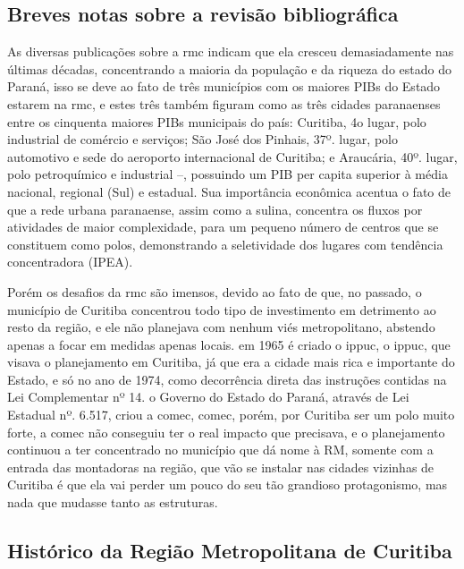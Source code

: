 	\subsection{Breves notas sobre a revisão bibliográfica}
	
	As diversas publicações sobre a \gls{rmc} indicam que ela cresceu demasiadamente nas últimas décadas, concentrando a maioria da população e da riqueza do estado do Paraná, isso se deve ao fato de três municípios com os maiores PIBs do Estado estarem na \gls{rmc}, e estes três também figuram como as três cidades paranaenses entre os cinquenta maiores PIBs municipais do país: Curitiba, 4o lugar, polo industrial de comércio e serviços; São José dos Pinhais, 37º. lugar, polo automotivo e sede do aeroporto internacional de Curitiba; e Araucária, 40º. lugar, polo petroquímico e industrial –, possuindo um PIB per capita superior à média nacional, regional (Sul) e estadual. Sua importância econômica acentua o fato de que a rede urbana paranaense, assim como a sulina, concentra os fluxos por atividades de maior complexidade, para um pequeno número de centros que se constituem como polos, demonstrando a seletividade dos lugares com tendência concentradora (IPEA).
	
	Porém os desafios da \gls{rmc} são imensos, devido ao fato de que, no passado, o município de Curitiba concentrou todo tipo de investimento em detrimento ao resto da região, e ele não planejava com nenhum viés metropolitano, abstendo apenas a focar em medidas apenas locais. em 1965 é criado o \glsdesc{ippuc}, o \gls{ippuc}, que  visava o planejamento em Curitiba, já que era a cidade mais rica e importante do Estado, e só no ano de 1974, como decorrência direta das instruções contidas na Lei Complementar nº 14. o Governo do Estado do Paraná, através de Lei Estadual nº. 6.517, criou a \glsdesc{comec}, \gls{comec}, porém, por Curitiba ser um polo muito forte, a \gls{comec} não conseguiu ter o real impacto que precisava, e o planejamento continuou a ter concentrado no município que dá nome à RM, somente com a entrada das montadoras na região, que vão se instalar nas cidades vizinhas de Curitiba é que ela vai perder um pouco do seu tão grandioso protagonismo, mas nada que mudasse tanto as estruturas. 

	\subsection{Histórico da Região Metropolitana de Curitiba}
	
